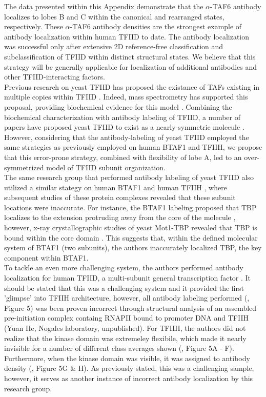 The data presented within this Appendix demonstrate that the $\alpha$-TAF6 antibody localizes to lobes B and C within the canonical and rearranged states, respectively. These $\alpha$-TAF6 antibody densities are the strongest example of antibody localization within human TFIID to date. The antibody localization was successful only after extensive 2D reference-free classification and subclassification of TFIID within distinct structural states. We believe that this strategy will be generally applicable for localization of additional antibodies and other TFIID-interacting factors.\\
\indent Previous research on yeast TFIID has proposed the existance of TAFs existing in multiple copies within TFIID \cite{Leurent_1554,Leurent_1797}. Indeed, mass spectrometry has supported this proposal, providing biochemical evidence for this model \cite{Sanders_2002}. Combining the biochemical characterization with antibody labeling of TFIID, a number of papers have proposed yeast TFIID to exist as a nearly-symmetric molecule \cite{Leurent_1554,Papai_191}. However, considering that the antibody-labeling of yeast TFIID employed the same strategies as previously employed on human BTAF1 and TFIIH, we propose that this error-prone strategy, combined with flexibility of lobe A, led to an over-symmetrized model of TFIID subunit organization.\\
\indent The same research group that performed antibody labeling of yeast TFIID also utilized a similar stategy on human BTAF1 \cite{Pereira_2004} and human TFIIH \cite{Schultz_2000}, where subsequent studies of these protein complexes revealed that these subunit locations were inaccurate. For instance, the BTAF1 labeling proposed that TBP localizes to the extension protruding away from the core of the molecule \cite{Pereira_2004}, however, x-ray crystallographic studies of yeast Mot1-TBP revealed that TBP is bound within the core domain \cite{Pereira_2004}. This suggests that, within the defined molecular system of BTAF1 (two subunits), the authors inaccurately localized TBP, the key component within BTAF1. \\
\indent To tackle an even more challenging system, the authors performed antibody localization for human TFIID, a multi-subunit general transcription factor \cite{Schultz_2000}. It should be stated that this was a challenging system and it provided the first 'glimpse' into TFIIH architecture, however, all antibody labeling performed (\cite{Schultz_2000}, Figure 5) was been proven incorrect through structural analysis of an assembled pre-initiation complex containg  RNAPII bound to promoter DNA and TFIIH (Yuan He, Nogales laboratory, unpublished). For TFIIH, the authors did not realize that the kinase domain was extremeley flexibile, which made it nearly invisible for a number of different class averages shown (\cite{Schultz_2000}, Figure 5A - F). Furthermore, when the kinase domain was visible, it was assigned to antibody density (\cite{Schultz_2000}, Figure 5G \& H). As previously stated, this was a challenging sample, however, it serves as another instance of incorrect antibody localization by this research group.\\
